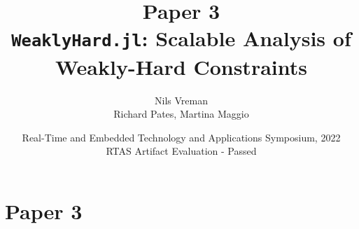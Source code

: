 \section{Paper 3}

\title[PhD Defence]{
    {\Huge Paper 3} \\
    \vspace{2mm}
    {\Large {\tt WeaklyHard.jl}: Scalable Analysis of Weakly-Hard Constraints} \\
}
\author[Nils Vreman]{
    Nils Vreman \\
    \vspace{3mm}
    {\large Richard Pates, Martina Maggio}
}
\date[RTAS 2022]{
    Real-Time and Embedded Technology and Applications Symposium, 2022\\
    {\large RTAS Artifact Evaluation - Passed}
}
\notitlelogo
{}

